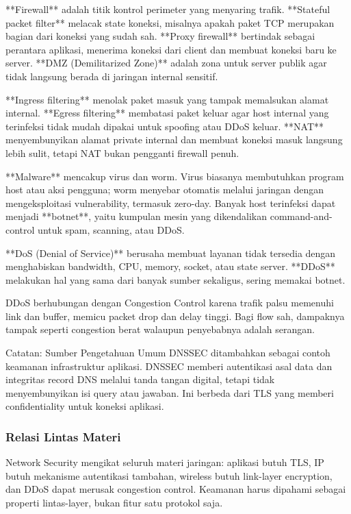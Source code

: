 **Firewall** adalah titik kontrol perimeter yang menyaring trafik. **Stateful packet filter** melacak state koneksi, misalnya apakah paket TCP merupakan bagian dari koneksi yang sudah sah. **Proxy firewall** bertindak sebagai perantara aplikasi, menerima koneksi dari client dan membuat koneksi baru ke server. **DMZ (Demilitarized Zone)** adalah zona untuk server publik agar tidak langsung berada di jaringan internal sensitif.

**Ingress filtering** menolak paket masuk yang tampak memalsukan alamat internal. **Egress filtering** membatasi paket keluar agar host internal yang terinfeksi tidak mudah dipakai untuk spoofing atau DDoS keluar. **NAT** menyembunyikan alamat private internal dan membuat koneksi masuk langsung lebih sulit, tetapi NAT bukan pengganti firewall penuh.

**Malware** mencakup virus dan worm. Virus biasanya membutuhkan program host atau aksi pengguna; worm menyebar otomatis melalui jaringan dengan mengeksploitasi vulnerability, termasuk zero-day. Banyak host terinfeksi dapat menjadi **botnet**, yaitu kumpulan mesin yang dikendalikan command-and-control untuk spam, scanning, atau DDoS.

**DoS (Denial of Service)** berusaha membuat layanan tidak tersedia dengan menghabiskan bandwidth, CPU, memory, socket, atau state server. **DDoS** melakukan hal yang sama dari banyak sumber sekaligus, sering memakai botnet.

DDoS berhubungan dengan Congestion Control karena trafik palsu memenuhi link dan buffer, memicu packet drop dan delay tinggi. Bagi flow sah, dampaknya tampak seperti congestion berat walaupun penyebabnya adalah serangan.

\begin{cmt}{Catatan: Sumber Pengetahuan Umum}{}
DNSSEC ditambahkan sebagai contoh keamanan infrastruktur aplikasi. DNSSEC memberi autentikasi asal data dan integritas record DNS melalui tanda tangan digital, tetapi tidak menyembunyikan isi query atau jawaban. Ini berbeda dari TLS yang memberi confidentiality untuk koneksi aplikasi.
\end{cmt}

\subsubsection{Relasi Lintas Materi}
\begin{jawab}
Network Security mengikat seluruh materi jaringan: aplikasi butuh TLS, IP butuh mekanisme autentikasi tambahan, wireless butuh link-layer encryption, dan DDoS dapat merusak congestion control. Keamanan harus dipahami sebagai properti lintas-layer, bukan fitur satu protokol saja.
\end{jawab}


